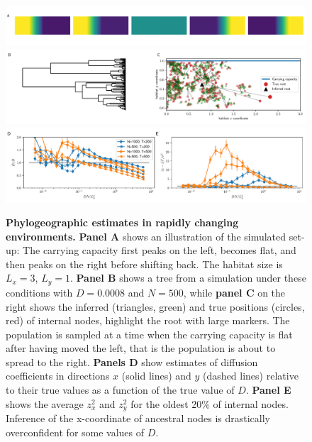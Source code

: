 \documentclass[aps,rmp, twocolumn]{revtex4}
\begin{document}
\begin{figure}
    \includegraphics[width=\textwidth]{figures/seasaw_illustration}
    \includegraphics[width=\textwidth]{figures/seasaw_example}
    \includegraphics[width=\textwidth]{figures/seasaw}
    \caption{\label{fig:seasaw} {\bf Phylogeographic estimates in rapidly changing environments.} {\bf Panel A} shows an illustration of the simulated set-up: The carrying capacity first peaks on the left, becomes flat, and then peaks on the right before shifting back. The habitat size is $L_x=3$, $L_y=1$.
    {\bf Panel B} shows a tree from a simulation under these conditions with $D=0.0008$ and $N=500$, while {\bf panel C} on the right shows the inferred (triangles, green) and true positions (circles, red) of internal nodes, highlight the root with large markers.
    The population is sampled at a time when the carrying capacity is flat after having moved the left, that is the population is about to spread to the right.
    {\bf Panels D} show estimates of diffusion coefficients in directions $x$ (solid lines) and $y$ (dashed lines) relative to their true values as a function of the true value of $D$. {\bf Panel E} shows the average $z_x^2$ and $z_y^2$ for the oldest 20\% of internal nodes. Inference of the x-coordinate of ancestral nodes is drastically overconfident for some values of $D$. }
\end{figure}
\end{document}
